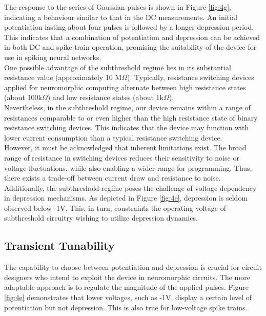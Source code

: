 \noindent The response to the series of Gaussian pulses is shown in Figure \ref{fig:4g}, indicating a behaviour similar to that in the DC measurements. An initial potentiation lasting about four pulses is followed by a longer depression period. This indicates that a combination of potentiation and depression can be achieved in both DC and spike train operation, promising the suitability of the device for use in spiking neural networks.\\

\noindent One possible advantage of the subthreshold regime lies in its substantial resistance value (approximately 10 M$\Omega$). Typically, resistance switching devices applied for neuromorphic computing alternate between high resistance states (about 100k$\Omega$) and low resistance states (about 1k$\Omega$). \\

\noindent Nevertheless, in the subthreshold regime, our device remains within a range of resistances comparable to or even higher than the high resistance state of binary resistance switching devices. This indicates that the device may function with lower current consumption than a typical resistance switching device.\\

\noindent However, it must be acknowledged that inherent limitations exist. The broad range of resistance in switching devices reduces their sensitivity to noise or voltage fluctuations, while also enabling a wider range for programming. Thus, there exists a trade-off between current draw and resistance to noise. Additionally, the subthreshold regime poses the challenge of voltage dependency in depression mechanisms. As depicted in Figure \ref{fig:4e}, depression is seldom observed below -1V. This, in turn, constraints the operating voltage of subthreshold circuitry wishing to utilize depression dynamics.

\subsection[Transient Tunability]{Transient Tunability}

The capability to choose between potentiation and depression is crucial for circuit designers who intend to exploit the device in neuromorphic circuits. The more adaptable approach is to regulate the magnitude of the applied pulses. Figure \ref{fig:4e} demonstrates that lower voltages, such as -1V, display a certain level of potentiation but not depression. This is also true for low-voltage spike trains.\\

